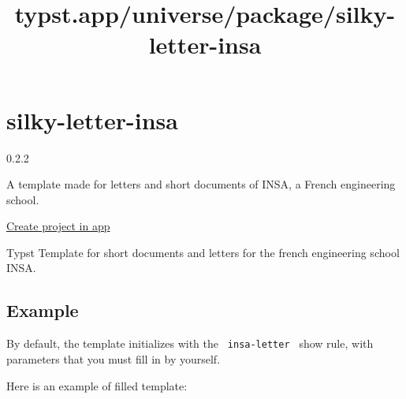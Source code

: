 \title{typst.app/universe/package/silky-letter-insa}

\label{banner}
\label{template-thumbnail}

\section{silky-letter-insa}\label{silky-letter-insa}

{ 0.2.2 }

A template made for letters and short documents of INSA, a French
engineering school.

\href{/app?template=silky-letter-insa&version=0.2.2}{Create project in
app}

\label{readme}
Typst Template for short documents and letters for the french
engineering school INSA.

\subsection{Example}\label{example}

By default, the template initializes with the \texttt{\ insa-letter\ }
show rule, with parameters that you must fill in by yourself.

Here is an example of filled template:

